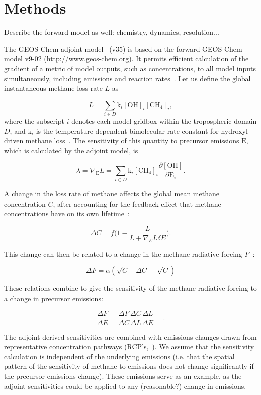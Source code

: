 \section{Methods}

Describe the forward model as well: chemistry, dynamics, resolution...

The GEOS-Chem adjoint model~\cite{ref:henze2007} (v35) is based on the forward GEOS-Chem model v9-02 (\url{http://www.geos-chem.org}). It permits efficient calculation of the gradient of a metric of model outputs, such as concentrations, to all model inputs simultaneously, including emissions and reaction rates~\cite{ref:walker2015}. Let us define the global instantaneous methane loss rate $L$ as

\begin{equation}
L=\sum_{i \in D} \mathrm{k}_i \mathrm{[OH]}_i \mathrm{[CH_4]}_i,
\end{equation}
where the subscript $i$ denotes each model gridbox within the tropospheric domain $D$, and $\mathrm{k}_i$ is the temperature-dependent bimolecular rate constant for hydroxyl-driven methane loss~\citep{ref:sander2011}. The sensitivity of this quantity to precursor emissions $\mathrm{E}$, which is calculated by the adjoint model, is

\begin{equation}
\lambda = \nabla_\mathrm{E} L = \sum_{i \in D} \mathrm{k}_i \mathrm{[CH_4]}_i \frac{\partial \mathrm{[OH]}}{\partial \mathrm{E}_i}.
\end{equation}

A change in the loss rate of methane affects the global mean methane concentration $C$, after accounting for the feedback effect that methane concentrations have on its own lifetime~\citep{ref:naik2005}:

\begin{equation}
\Delta C = f\big(1 - \frac{L}{L+\nabla_E L \delta E}\big).
\end{equation}

This change can then be related to a change in the methane radiative forcing $F$~\citep{ref:myhre1998}:

\begin{equation}
\Delta F = \alpha (\sqrt{C-\Delta C} - \sqrt{C})
\end{equation}

These relations combine to give the sensitivity of the methane radiative forcing to a change in precursor emissions:

\begin{equation}
\frac{\Delta F}{\Delta E} = \frac{\Delta F}{\Delta C} \frac{\Delta C}{\Delta L} \frac{\Delta L}{\Delta E} = .
\end{equation}

The adjoint-derived sensitivities are combined with emissions changes drawn from representative concentration pathways (RCP's,~\citet{ref:vanvuuren2011}). We assume that the sensitivity calculation is independent of the underlying emissions (i.e. that the spatial pattern of the sensitivity of methane to emissions does not change significantly if the precursor emissions change). These emissions serve as an example, as the adjoint sensitivities could be applied to any (reasonable?) change in emissions.